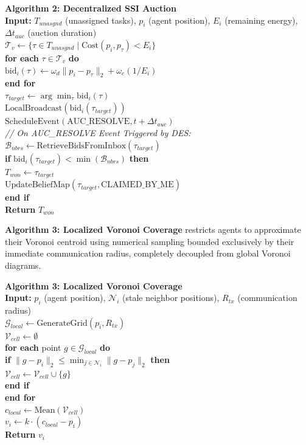 \documentclass[conference]{IEEEtran}
\begin{document}
\vspace{0.5em}
\noindent \textbf{Algorithm 2: Decentralized SSI Auction} \\
\textbf{Input:} $T_{unasgnd}$ (unassigned tasks), $p_i$ (agent position), $E_i$ (remaining energy), $\Delta t_{auc}$ (auction duration) \\
$\mathcal{T}_{v} \leftarrow \{ \tau \in T_{unasgnd} \mid \text{Cost}(p_i, p_\tau) < E_i \}$ \\
\textbf{for each} $\tau \in \mathcal{T}_{v}$ \textbf{do} \\
\quad $\text{bid}_i(\tau) \leftarrow \omega_{d} \|p_i - p_\tau\|_2 + \omega_{e} \left(1 / E_i\right)$ \\
\textbf{end for} \\
$\tau_{target} \leftarrow \arg\min_{\tau} \text{bid}_i(\tau)$ \\
$\text{LocalBroadcast}(\text{bid}_i(\tau_{target}))$ \\
$\text{ScheduleEvent}(\text{AUC\_RESOLVE}, t + \Delta t_{auc})$ \\
\textit{// On AUC\_RESOLVE Event Triggered by DES:} \\
$\mathcal{B}_{nbrs} \leftarrow \text{RetrieveBidsFromInbox}(\tau_{target})$ \\
\textbf{if} $\text{bid}_i(\tau_{target}) < \min(\mathcal{B}_{nbrs})$ \textbf{then} \\
\quad $T_{won} \leftarrow \tau_{target}$ \\
\quad $\text{UpdateBeliefMap}(\tau_{target}, \text{CLAIMED\_BY\_ME})$ \\
\textbf{end if} \\
\textbf{Return} $T_{won}$

\vspace{1em}
\noindent \textbf{Algorithm 3: Localized Voronoi Coverage} restricts agents to approximate their Voronoi centroid using numerical sampling bounded exclusively by their immediate communication radius, completely decoupled from global Voronoi diagrams.

\vspace{0.5em}
\noindent \textbf{Algorithm 3: Localized Voronoi Coverage} \\
\textbf{Input:} $p_i$ (agent position), $\mathcal{N}_i$ (stale neighbor positions), $R_{tx}$ (communication radius) \\
$\mathcal{G}_{local} \leftarrow \text{GenerateGrid}(p_i, R_{tx})$ \\
$\mathcal{V}_{cell} \leftarrow \emptyset$ \\
\textbf{for each} point $g \in \mathcal{G}_{local}$ \textbf{do} \\
\quad \textbf{if} $\|g - p_i\|_2 \le \min_{j \in \mathcal{N}_i} \|g - p_j\|_2$ \textbf{then} \\
\quad \quad $\mathcal{V}_{cell} \leftarrow \mathcal{V}_{cell} \cup \{g\}$ \\
\quad \textbf{end if} \\
\textbf{end for} \\
$c_{local} \leftarrow \text{Mean}(\mathcal{V}_{cell})$ \\
$v_i \leftarrow k \cdot (c_{local} - p_i)$ \\
\textbf{Return} $v_i$
\end{document}
